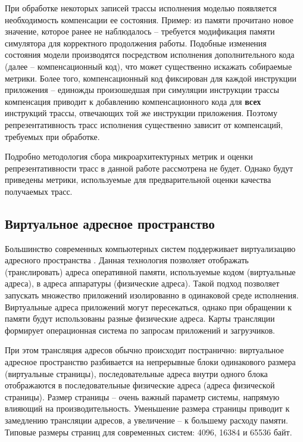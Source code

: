 При обработке некоторых записей трассы исполнения моделью появляется необходимость компенсации ее состояния. Пример: из памяти прочитано новое значение, которое ранее не наблюдалось -- требуется модификация памяти симулятора для корректного продолжения работы. Подобные изменения состояния модели производятся посредством исполнения дополнительного кода (далее -- компенсационный код), что может существенно искажать собираемые метрики. Более того, компенсационный код фиксирован для каждой инструкции приложения -- единожды произошедшая при симуляции инструкции трассы компенсация приводит к добавлению компенсационного кода для \textbf{всех} инструкций трассы, отвечающих той же инструкции приложения. Поэтому репрезентативность трасс исполнения существенно зависит от компенсаций, требуемых при обработке.

Подробно методология сбора микроархитектурных метрик и оценки репрезентативности трасс в данной работе рассмотрена не будет. Однако будут приведены метрики, используемые для предварительной оценки качества получаемых трасс.

\subsection{Виртуальное адресное пространство}

Большинство современных компьютерных систем поддерживает виртуализацию адресного пространства \cite{arm_memory_management}. Данная технология позволяет отображать (транслировать) адреса оперативной памяти, используемые кодом (виртуальные адреса), в адреса аппаратуры (физические адреса). Такой подход позволяет запускать множество приложений изолированно в одинаковой среде исполнения. Виртуальные адреса приложений могут пересекаться, однако при обращении к памяти будут использованы разные физические адреса. Карты трансляции формирует операционная система по запросам приложений и загрузчиков.

При этом трансляция адресов обычно происходит постранично: виртуальное адресное пространство разбивается на непрерывные блоки одинакового размера (виртуальные страницы), последовательные адреса внутри одного блока отображаются в последовательные физические адреса (адреса физической страницы). Размер страницы -- очень важный параметр системы, напрямую влияющий на производительность. Уменьшение размера страницы приводит к замедлению трансляции адресов, а увеличение -- к большему расходу памяти. Типовые размеры страниц для современных систем: 4096, 16384 и 65536 байт.

